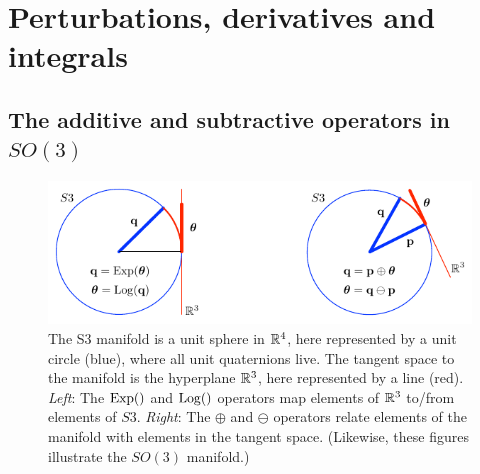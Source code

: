 %
%
%
%
%




\section{Perturbations, derivatives and integrals}



\subsection{The additive and subtractive operators in $SO(3)$}

\begin{figure}[tb]
\centering
\includegraphics{figures/manifold}
\caption{The S3 manifold is a unit sphere in ${\mathbb R}^4$, here represented by a unit circle (blue),  where all unit quaternions live. 
The tangent space to the manifold is the hyperplane ${\mathbb R}^3$, here represented by a line (red). 
\emph{Left}: The $\operatorname*{Exp}()$ and $\operatorname*{Log}()$ operators map elements of ${\mathbb R}^3$ to/from elements of $S3$. 
\emph{Right}: The $\oplus$ and $\ominus$ operators relate elements of the manifold with elements in the tangent space. (Likewise, these figures illustrate the $SO(3)$ manifold.)}
\label{fig:manifold}
\end{figure}


